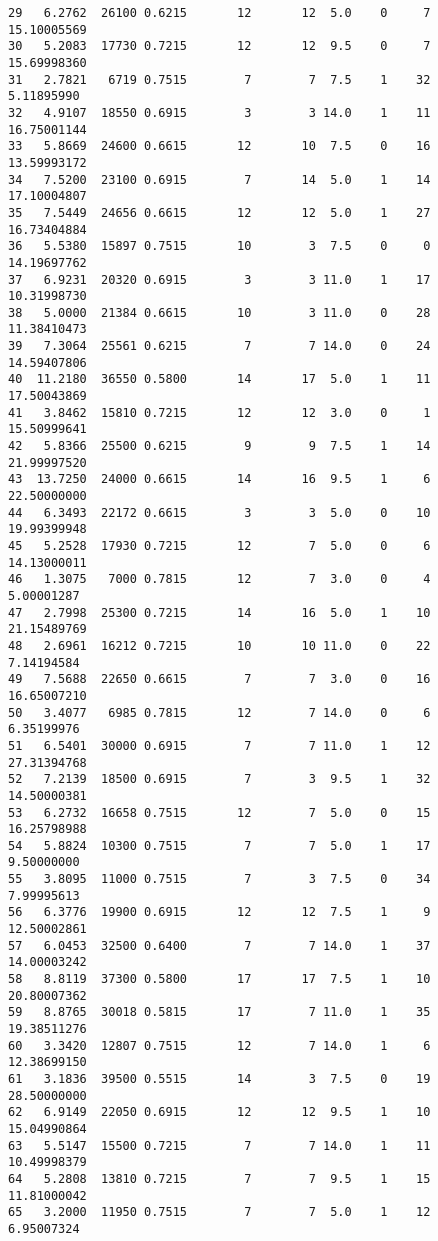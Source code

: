 \documentclass[
  letterpaper,
  DIV=11,
  numbers=noendperiod]{scrreprt}
\begin{document}
\begin{verbatim}
29   6.2762  26100 0.6215       12       12  5.0    0     7 15.10005569
30   5.2083  17730 0.7215       12       12  9.5    0     7 15.69998360
31   2.7821   6719 0.7515        7        7  7.5    1    32  5.11895990
32   4.9107  18550 0.6915        3        3 14.0    1    11 16.75001144
33   5.8669  24600 0.6615       12       10  7.5    0    16 13.59993172
34   7.5200  23100 0.6915        7       14  5.0    1    14 17.10004807
35   7.5449  24656 0.6615       12       12  5.0    1    27 16.73404884
36   5.5380  15897 0.7515       10        3  7.5    0     0 14.19697762
37   6.9231  20320 0.6915        3        3 11.0    1    17 10.31998730
38   5.0000  21384 0.6615       10        3 11.0    0    28 11.38410473
39   7.3064  25561 0.6215        7        7 14.0    0    24 14.59407806
40  11.2180  36550 0.5800       14       17  5.0    1    11 17.50043869
41   3.8462  15810 0.7215       12       12  3.0    0     1 15.50999641
42   5.8366  25500 0.6215        9        9  7.5    1    14 21.99997520
43  13.7250  24000 0.6615       14       16  9.5    1     6 22.50000000
44   6.3493  22172 0.6615        3        3  5.0    0    10 19.99399948
45   5.2528  17930 0.7215       12        7  5.0    0     6 14.13000011
46   1.3075   7000 0.7815       12        7  3.0    0     4  5.00001287
47   2.7998  25300 0.7215       14       16  5.0    1    10 21.15489769
48   2.6961  16212 0.7215       10       10 11.0    0    22  7.14194584
49   7.5688  22650 0.6615        7        7  3.0    0    16 16.65007210
50   3.4077   6985 0.7815       12        7 14.0    0     6  6.35199976
51   6.5401  30000 0.6915        7        7 11.0    1    12 27.31394768
52   7.2139  18500 0.6915        7        3  9.5    1    32 14.50000381
53   6.2732  16658 0.7515       12        7  5.0    0    15 16.25798988
54   5.8824  10300 0.7515        7        7  5.0    1    17  9.50000000
55   3.8095  11000 0.7515        7        3  7.5    0    34  7.99995613
56   6.3776  19900 0.6915       12       12  7.5    1     9 12.50002861
57   6.0453  32500 0.6400        7        7 14.0    1    37 14.00003242
58   8.8119  37300 0.5800       17       17  7.5    1    10 20.80007362
59   8.8765  30018 0.5815       17        7 11.0    1    35 19.38511276
60   3.3420  12807 0.7515       12        7 14.0    1     6 12.38699150
61   3.1836  39500 0.5515       14        3  7.5    0    19 28.50000000
62   6.9149  22050 0.6915       12       12  9.5    1    10 15.04990864
63   5.5147  15500 0.7215        7        7 14.0    1    11 10.49998379
64   5.2808  13810 0.7215        7        7  9.5    1    15 11.81000042
65   3.2000  11950 0.7515        7        7  5.0    1    12  6.95007324

\end{verbatim}
\end{document}
